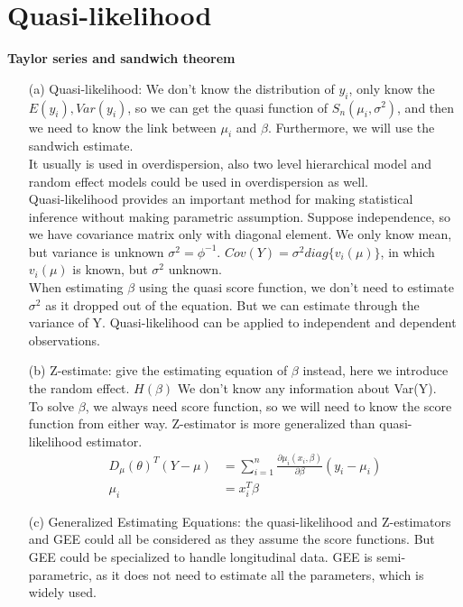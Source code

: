
 \section{Quasi-likelihood}
 
 \textbf{Taylor series and sandwich theorem}
 
 \begin{itemize}
     \item [(a)] Quasi-likelihood: We don't know the distribution of $y_i$, only know the $E(y_i), Var(y_i)$, so we can get the quasi function of $S_n(\mu_i, \sigma^2)$, and then we need to know the link between $\mu_i$ and $\beta$. Furthermore, we will use the sandwich estimate.\\
     It usually is used in overdispersion, also two level hierarchical model and random effect models could be used in overdispersion as well.\\
     Quasi-likelihood provides an important method for making statistical inference without making parametric assumption. Suppose independence, so we have covariance matrix only with diagonal element. We only know mean, but variance is unknown $\sigma^2 = \phi^{-1}$. $Cov(Y) =  \sigma^2 diag\{v_i(\mu)\}$, in which $v_i(\mu)$ is known, but $\sigma^2$ unknown.\\
     When estimating $\beta$ using the quasi score function, we don't need to estimate $\sigma^2$ as it dropped out of the equation. But we can estimate through the variance of Y. 
Quasi-likelihood can be applied to independent and dependent observations.\\
     
     \item[(b)]  Z-estimate: give the estimating equation of $\beta$ instead, here we introduce the random effect. $H(\beta)$ We don't know any information about Var(Y).\\
 To solve $\beta$, we always need score function, so we will need to know the score function from either way. Z-estimator is more generalized than quasi-likelihood estimator. \\
 \begin{align*}
    D_{\mu}(\theta)^T (Y-\mu) &= \sum_{i=1}^n \frac{\partial \mu_i(x_i, \beta)}{\partial \beta} (y_i-\mu_i)\\
    \mu_i &= x_i^T \beta
\end{align*}
 \item[(c)] Generalized Estimating Equations: the quasi-likelihood and Z-estimators and GEE could all be considered as they assume the score functions. But GEE could be specialized to handle longitudinal data. GEE is semi-parametric, as it does not need to estimate all the parameters, which is widely used. \\
 \end{itemize}

 